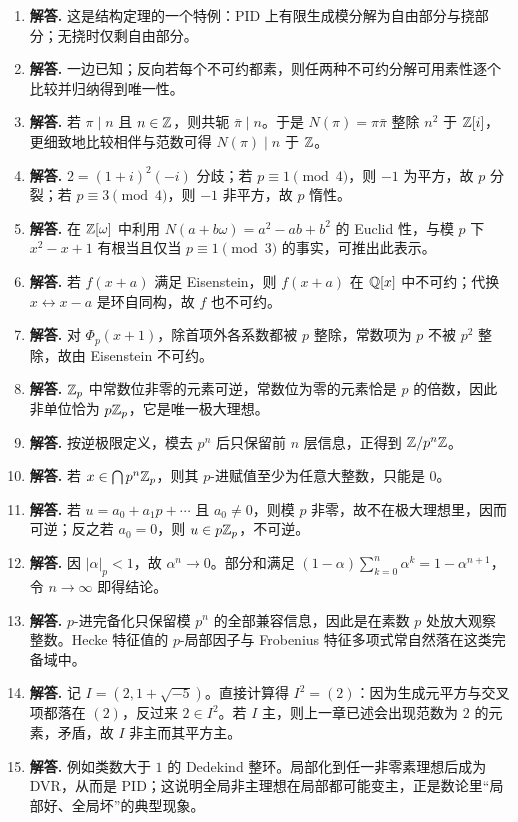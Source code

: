 \begin{enumerate}[label=\textbf{\arabic*.}, leftmargin=*, itemsep=1em]
\item \textbf{解答.} 这是结构定理的一个特例：PID 上有限生成模分解为自由部分与挠部分；无挠时仅剩自由部分。
\item \textbf{解答.} 一边已知；反向若每个不可约都素，则任两种不可约分解可用素性逐个比较并归纳得到唯一性。
\item \textbf{解答.} 若 $\pi\mid n$ 且 $n\in\mathbb{Z}$，则共轭 $\bar\pi\mid n$。于是 $N(\pi)=\pi\bar\pi$ 整除 $n^2$ 于 $\mathbb{Z}[i]$，更细致地比较相伴与范数可得 $N(\pi)\mid n$ 于 $\mathbb{Z}$。
\item \textbf{解答.} $2=(1+i)^2(-i)$ 分歧；若 $p\equiv1\pmod4$，则 $-1$ 为平方，故 $p$ 分裂；若 $p\equiv3\pmod4$，则 $-1$ 非平方，故 $p$ 惰性。
\item \textbf{解答.} 在 $\mathbb{Z}[\omega]$ 中利用 $N(a+b\omega)=a^2-ab+b^2$ 的 Euclid 性，与模 $p$ 下 $x^2-x+1$ 有根当且仅当 $p\equiv1\pmod3$ 的事实，可推出此表示。
\item \textbf{解答.} 若 $f(x+a)$ 满足 Eisenstein，则 $f(x+a)$ 在 $\mathbb{Q}[x]$ 中不可约；代换 $x\leftrightarrow x-a$ 是环自同构，故 $f$ 也不可约。
\item \textbf{解答.} 对 $\Phi_p(x+1)$，除首项外各系数都被 $p$ 整除，常数项为 $p$ 不被 $p^2$ 整除，故由 Eisenstein 不可约。
\item \textbf{解答.} $\mathbb{Z}_p$ 中常数位非零的元素可逆，常数位为零的元素恰是 $p$ 的倍数，因此非单位恰为 $p\mathbb{Z}_p$，它是唯一极大理想。
\item \textbf{解答.} 按逆极限定义，模去 $p^n$ 后只保留前 $n$ 层信息，正得到 $\mathbb{Z}/p^n\mathbb{Z}$。
\item \textbf{解答.} 若 $x\in\bigcap p^n\mathbb{Z}_p$，则其 $p$-进赋值至少为任意大整数，只能是 $0$。
\item \textbf{解答.} 若 $u=a_0+a_1p+\cdots$ 且 $a_0\ne0$，则模 $p$ 非零，故不在极大理想里，因而可逆；反之若 $a_0=0$，则 $u\in p\mathbb{Z}_p$，不可逆。
\item \textbf{解答.} 因 $|\alpha|_p<1$，故 $\alpha^n\to0$。部分和满足 $(1-\alpha)\sum_{k=0}^{n}\alpha^k=1-\alpha^{n+1}$，令 $n\to\infty$ 即得结论。
\item \textbf{解答.} $p$-进完备化只保留模 $p^n$ 的全部兼容信息，因此是在素数 $p$ 处放大观察整数。Hecke 特征值的 $p$-局部因子与 Frobenius 特征多项式常自然落在这类完备域中。
\item \textbf{解答.} 记 $I=(2,1+\sqrt{-5})$。直接计算得 $I^2=(2)$：因为生成元平方与交叉项都落在 $(2)$，反过来 $2\in I^2$。若 $I$ 主，则上一章已述会出现范数为 $2$ 的元素，矛盾，故 $I$ 非主而其平方主。
\item \textbf{解答.} 例如类数大于 $1$ 的 Dedekind 整环。局部化到任一非零素理想后成为 DVR，从而是 PID；这说明全局非主理想在局部都可能变主，正是数论里“局部好、全局坏”的典型现象。
\end{enumerate}
